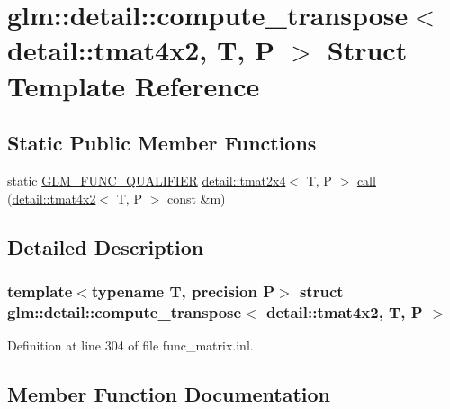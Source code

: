 \hypertarget{structglm_1_1detail_1_1compute__transpose_3_01detail_1_1tmat4x2_00_01_t_00_01_p_01_4}{}\section{glm\+:\+:detail\+:\+:compute\+\_\+transpose$<$ detail\+:\+:tmat4x2, T, P $>$ Struct Template Reference}
\label{structglm_1_1detail_1_1compute__transpose_3_01detail_1_1tmat4x2_00_01_t_00_01_p_01_4}
\subsection*{Static Public Member Functions}
\begin{DoxyCompactItemize}
\item 
static \hyperlink{setup_8hpp_a33fdea6f91c5f834105f7415e2a64407}{G\+L\+M\+\_\+\+F\+U\+N\+C\+\_\+\+Q\+U\+A\+L\+I\+F\+I\+ER} \hyperlink{structglm_1_1detail_1_1tmat2x4}{detail\+::tmat2x4}$<$ T, P $>$ \hyperlink{structglm_1_1detail_1_1compute__transpose_3_01detail_1_1tmat4x2_00_01_t_00_01_p_01_4_a345735a0a7bc0fa49d41693771b8c72e}{call} (\hyperlink{structglm_1_1detail_1_1tmat4x2}{detail\+::tmat4x2}$<$ T, P $>$ const \&m)
\end{DoxyCompactItemize}


\subsection{Detailed Description}
\subsubsection*{template$<$typename T, precision P$>$\newline
struct glm\+::detail\+::compute\+\_\+transpose$<$ detail\+::tmat4x2, T, P $>$}



Definition at line 304 of file func\+\_\+matrix.\+inl.



\subsection{Member Function Documentation}
\mbox{\label{structglm_1_1detail_1_1compute__transpose_3_01detail_1_1tmat4x2_00_01_t_00_01_p_01_4_a345735a0a7bc0fa49d41693771b8c72e}} 
